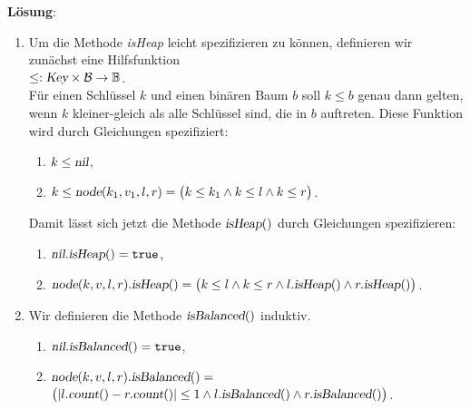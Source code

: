\documentclass{article}
\begin{document}
\noindent
\textbf{L\"osung}:
\begin{enumerate}
\item Um die Methode \textsl{isHeap} leicht spezifizieren zu k\"onnen, definieren wir zun\"achst
      eine Hilfsfunktion
      \\[0.2cm]
      \hspace*{1.3cm}
      $\leq : \textsl{Key} \times \mathcal{B} \rightarrow \mathbb{B}$.
      \\[0.2cm]
      F\"ur einen Schl\"ussel $k$ und einen bin\"aren Baum $b$ soll $k \leq b$ genau dann gelten,
      wenn $k$ kleiner-gleich als alle Schl\"ussel sind, die in $b$ auftreten.
      Diese Funktion wird durch Gleichungen spezifiziert:
      \begin{enumerate}
      \item $k \leq \textsl{nil}$,
      \item $k \leq \textsl{node}(k_1,v_1,l,r) = \bigl(k \leq k_1 \wedge k \leq l \wedge k \leq r\bigr)$.
      \end{enumerate}
      Damit l\"asst sich jetzt die Methode $\textsl{isHeap}()$ durch Gleichungen spezifizieren:
      \begin{enumerate}
      \item $\textsl{nil}.\textsl{isHeap}() = \mathtt{true}$,
      \item $\textsl{node}(k,v,l,r).\textsl{isHeap}() = 
             \bigl(k \leq l \wedge k \leq r \wedge l.\textsl{isHeap}() \wedge r.\textsl{isHeap}()\bigr)$.
      \end{enumerate}
\item Wir definieren die Methode $\textsl{isBalanced}()$ induktiv.
      \begin{enumerate}
      \item $\textsl{nil}.\textsl{isBalanced}() = \mathtt{true}$,
      \item $\textsl{node}(k,v,l,r).\textsl{isBalanced}() =$ \\[0.1cm]
            \hspace*{\fill}
            $\bigl(|l.\textsl{count}() - r.\textsl{count}()| \leq 1 
             \wedge l.\textsl{isBalanced}()\wedge r.\textsl{isBalanced}()\bigr)$.
      \end{enumerate}
\end{enumerate}
\vspace{0.3cm}
\end{document}
